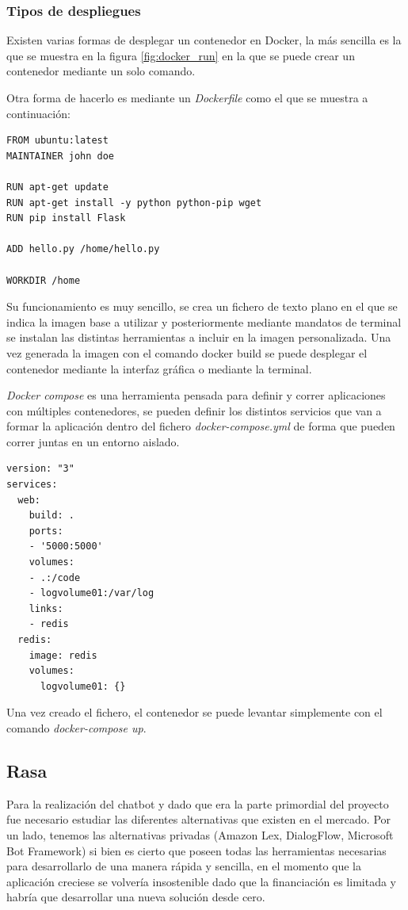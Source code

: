 \subsubsection{Tipos de despliegues}
Existen varias formas de desplegar un contenedor en Docker, la más sencilla es la que se muestra en la figura \ref{fig:docker_run} en la que se puede crear un contenedor mediante un solo comando. 

Otra forma de hacerlo es mediante un \textit{Dockerfile} como el que se muestra a continuación:

\begin{lstlisting}
FROM ubuntu:latest
MAINTAINER john doe 

RUN apt-get update
RUN apt-get install -y python python-pip wget
RUN pip install Flask

ADD hello.py /home/hello.py

WORKDIR /home
\end{lstlisting}

Su funcionamiento es muy sencillo, se crea un fichero de texto plano en el que se indica la imagen base a utilizar y posteriormente mediante mandatos de terminal se instalan las distintas herramientas a incluir en la imagen personalizada. Una vez generada la imagen con el comando docker build se puede desplegar el contenedor mediante la interfaz gráfica o mediante la terminal.

\textit{Docker compose} es una herramienta pensada para definir y correr aplicaciones con múltiples contenedores, se pueden definir los distintos servicios que van a formar la aplicación dentro del fichero \textit{docker-compose.yml} de forma que pueden correr juntas en un entorno aislado.

\vspace{.7cm}
\begin{lstlisting}
version: "3"
services:
  web:
    build: .
    ports:
    - '5000:5000'
    volumes:
    - .:/code
    - logvolume01:/var/log
    links:
    - redis
  redis:
    image: redis
    volumes:
      logvolume01: {}
\end{lstlisting}

Una vez creado el fichero, el contenedor se puede levantar simplemente con el comando \textit{docker-compose up}.

\subsection{Rasa}

Para la realización del chatbot y dado que era la parte primordial del proyecto fue necesario estudiar las diferentes alternativas que existen en el mercado. Por un lado, tenemos las alternativas privadas (Amazon Lex, DialogFlow, Microsoft Bot Framework) si bien es cierto que poseen todas las herramientas necesarias para desarrollarlo de una manera rápida y sencilla, en el momento que la aplicación creciese se volvería insostenible dado que la financiación es limitada y habría que desarrollar una nueva solución desde cero.

